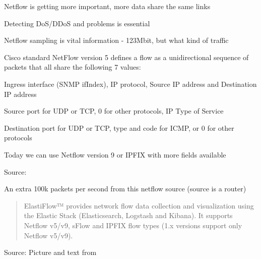\documentclass[Screen16to9,17pt]{foils}
\begin{document}

\begin{list1}
\item Netflow is getting more important, more data share the same links
\item Detecting DoS/DDoS and problems is essential
\item Netflow sampling is vital information - 123Mbit, but what kind of traffic
\item Cisco standard NetFlow version 5 defines a flow as a unidirectional sequence of packets that all share the following 7 values:
\begin{list2}
\item Ingress interface (SNMP ifIndex), IP protocol, Source IP address and Destination IP address
\item Source port for UDP or TCP, 0 for other protocols, IP Type of Service
\item Destination port for UDP or TCP, type and code for ICMP, or 0 for other protocols
\end{list2}
\item Today we can use Netflow version 9 or IPFIX with more fields available
\end{list1}

Source: \\{\footnotesize
{}
}







\centerline{An extra 100k packets per second from this netflow source (source is a router)}



\begin{quote}
  ElastiFlow™ provides network flow data collection and visualization using the Elastic Stack (Elasticsearch, Logstash and Kibana). It supports Netflow v5/v9, sFlow and IPFIX flow types (1.x versions support only Netflow v5/v9).
\end{quote}
Source: Picture and text from  \\
\end{document}
